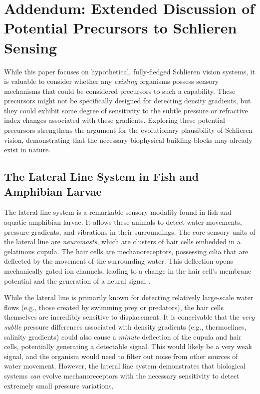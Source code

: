 \documentclass[11pt]{article}
\begin{document}






\appendix
\section{Addendum: Extended Discussion of Potential Precursors to Schlieren Sensing}

While this paper focuses on hypothetical, fully-fledged Schlieren vision systems, it is valuable to consider whether any \textit{existing} organisms possess sensory mechanisms that could be considered precursors to such a capability. These precursors might not be specifically designed for detecting density gradients, but they could exhibit some degree of sensitivity to the subtle pressure or refractive index changes associated with these gradients. Exploring these potential precursors strengthens the argument for the evolutionary plausibility of Schlieren vision, demonstrating that the necessary biophysical building blocks may already exist in nature.

\subsection{The Lateral Line System in Fish and Amphibian Larvae}

The lateral line system \cite{Dijkgraaf1963LateralLine} is a remarkable sensory modality found in fish and aquatic amphibian larvae. It allows these animals to detect water movements, pressure gradients, and vibrations in their surroundings. The core sensory units of the lateral line are \textit{neuromasts}, which are clusters of hair cells embedded in a gelatinous cupula. The hair cells are mechanoreceptors, possessing cilia that are deflected by the movement of the surrounding water. This deflection opens mechanically gated ion channels, leading to a change in the hair cell's membrane potential and the generation of a neural signal \cite{Hudspeth1989EarWorks}.

While the lateral line is primarily known for detecting relatively large-scale water flows (e.g., those created by swimming prey or predators), the hair cells themselves are incredibly sensitive to displacement. It is conceivable that the \textit{very subtle} pressure differences associated with density gradients (e.g., thermoclines, salinity gradients) could also cause a \textit{minute} deflection of the cupula and hair cells, potentially generating a detectable signal. This would likely be a very weak signal, and the organism would need to filter out noise from other sources of water movement. However, the lateral line system demonstrates that biological systems \textit{can} evolve mechanoreceptors with the necessary sensitivity to detect extremely small pressure variations.
\end{document}
